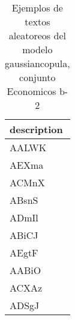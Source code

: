 \begin{table}[H]
\centering
\fontsize{8}{14}\selectfont
\caption{Ejemplos de textos aleatoreos del modelo gaussiancopula, conjunto Economicos b-2}
\label{table-sample10-economicos-b-2-gaussiancopula-text}
\begin{tabular}{|m{50em}|}
\hline
\rowcolor[gray]{0.8}
description \\
\hline AALWK \\
\hline AEXma \\
\hline ACMnX \\
\hline ABsnS \\
\hline ADmIl \\
\hline ABiCJ \\
\hline AEgtF \\
\hline AABiO \\
\hline ACXAz \\
\hline ADSgJ \\
\hline
\end{tabular}
\end{table}
